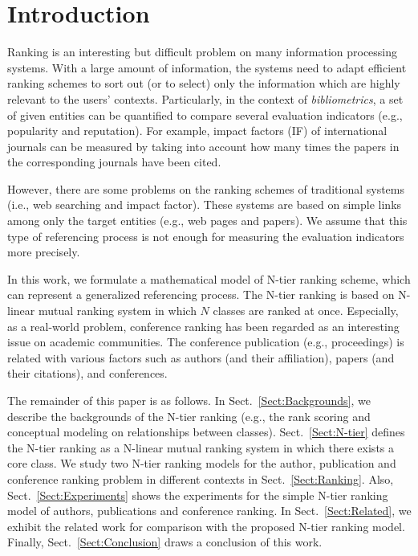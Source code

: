 \documentclass[lnicst]{svmultln}
\begin{document}
\section{Introduction}
Ranking is an interesting but difficult problem on many information processing systems. With a large amount of information, the systems need to adapt efficient ranking schemes to sort out (or to select) only the information which are highly relevant to the users' contexts. 
Particularly, in the context of \emph{bibliometrics}, %
a set of given entities can be quantified to compare several evaluation indicators (e.g., popularity and reputation). For example, impact factors (IF) of international journals can be measured by taking into account how many times the papers in the corresponding journals have been cited. 


However, there are some problems on the ranking schemes of traditional systems (i.e., web searching and impact factor). 
These systems are based on simple links among only the target entities (e.g., web pages and papers).
We assume that this type of referencing process is not enough for measuring the evaluation indicators more precisely. 

In this work, we formulate a mathematical model of N-tier ranking scheme, which can represent a generalized referencing process.
The N-tier ranking is based on N-linear mutual ranking system in which $N$ classes are ranked at once.
Especially, as a real-world problem, 
conference ranking has been regarded as an interesting issue on academic communities. 
The conference publication (e.g., proceedings) is related with various factors 
such as authors (and their affiliation), papers (and their citations), and conferences. 


The remainder of this paper is as follows.
In Sect.~\ref{Sect:Backgrounds}, we describe the backgrounds of the N-tier ranking (e.g., the rank scoring and conceptual modeling on relationships between classes).
Sect.~\ref{Sect:N-tier} defines the N-tier ranking as a N-linear mutual ranking system in which there exists a core class. 
We study two N-tier ranking models for the author, publication and conference ranking problem in different contexts in Sect.~\ref{Sect:Ranking}.
Also, Sect.~\ref{Sect:Experiments} shows the experiments for the simple N-tier ranking model of authors, publications and conference ranking. 
In Sect.~\ref{Sect:Related}, we exhibit the related work for comparison with the proposed N-tier ranking model. Finally, Sect.~\ref{Sect:Conclusion} draws a conclusion of this work. 
\end{document}
